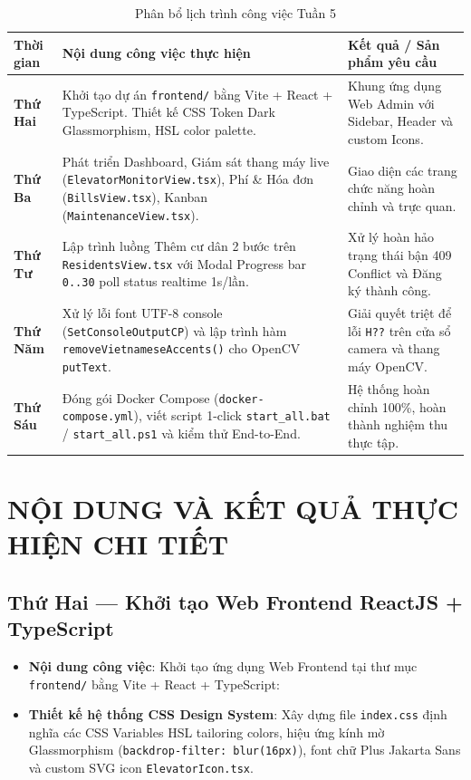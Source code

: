 \documentclass[12pt,a4paper]{article}
\begin{document}
\begin{table}[H]
\centering
\small
\begin{tabularx}{\textwidth}{|l|X|X|}
\hline
\textbf{Thời gian} & \textbf{Nội dung công việc thực hiện} & \textbf{Kết quả / Sản phẩm yêu cầu} \\ \hline
\textbf{Thứ Hai} & Khởi tạo dự án \texttt{frontend/} bằng Vite + React + TypeScript. Thiết kế CSS Token Dark Glassmorphism, HSL color palette. & Khung ứng dụng Web Admin với Sidebar, Header và custom Icons. \\ \hline
\textbf{Thứ Ba} & Phát triển Dashboard, Giám sát thang máy live (\texttt{ElevatorMonitorView.tsx}), Phí \& Hóa đơn (\texttt{BillsView.tsx}), Kanban (\texttt{MaintenanceView.tsx}). & Giao diện các trang chức năng hoàn chỉnh và trực quan. \\ \hline
\textbf{Thứ Tư} & Lập trình luồng Thêm cư dân 2 bước trên \texttt{ResidentsView.tsx} với Modal Progress bar \texttt{0..30} poll status realtime 1s/lần. & Xử lý hoàn hảo trạng thái bận 409 Conflict và Đăng ký thành công. \\ \hline
\textbf{Thứ Năm} & Xử lý lỗi font UTF-8 console (\texttt{SetConsoleOutputCP}) và lập trình hàm \texttt{removeVietnameseAccents()} cho OpenCV \texttt{putText}. & Giải quyết triệt để lỗi \texttt{H??} trên cửa sổ camera và thang máy OpenCV. \\ \hline
\textbf{Thứ Sáu} & Đóng gói Docker Compose (\texttt{docker-compose.yml}), viết script 1-click \texttt{start\_all.bat} / \texttt{start\_all.ps1} và kiểm thử End-to-End. & Hệ thống hoàn chỉnh 100\%, hoàn thành nghiệm thu thực tập. \\ \hline
\end{tabularx}
\caption{Phân bổ lịch trình công việc Tuần 5}
\end{table}

\newpage

\section{NỘI DUNG VÀ KẾT QUẢ THỰC HIỆN CHI TIẾT}

\subsection{Thứ Hai — Khởi tạo Web Frontend ReactJS + TypeScript}
\begin{itemize}
    \item \textbf{Nội dung công việc}: Khởi tạo ứng dụng Web Frontend tại thư mục \texttt{frontend/} bằng Vite + React + TypeScript:
    \item \textbf{Thiết kế hệ thống CSS Design System}: Xây dựng file \texttt{index.css} định nghĩa các CSS Variables HSL tailoring colors, hiệu ứng kính mờ Glassmorphism (\texttt{backdrop-filter: blur(16px)}), font chữ Plus Jakarta Sans và custom SVG icon \texttt{ElevatorIcon.tsx}.
\end{itemize}
\end{document}
